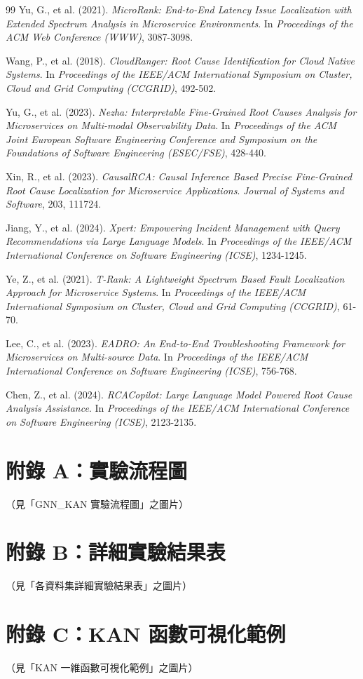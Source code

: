 \documentclass[10pt,a4paper,twocolumn]{article}
\begin{document}
\begin{thebibliography}{99}
Yu, G., et al. (2021).
\textit{MicroRank: End-to-End Latency Issue Localization with Extended Spectrum Analysis in Microservice Environments}.
In \textit{Proceedings of the ACM Web Conference (WWW)}, 3087-3098.

Wang, P., et al. (2018).
\textit{CloudRanger: Root Cause Identification for Cloud Native Systems}.
In \textit{Proceedings of the IEEE/ACM International Symposium on Cluster, Cloud and Grid Computing (CCGRID)}, 492-502.

Yu, G., et al. (2023).
\textit{Nezha: Interpretable Fine-Grained Root Causes Analysis for Microservices on Multi-modal Observability Data}.
In \textit{Proceedings of the ACM Joint European Software Engineering Conference and Symposium on the Foundations of Software Engineering (ESEC/FSE)}, 428-440.

Xin, R., et al. (2023).
\textit{CausalRCA: Causal Inference Based Precise Fine-Grained Root Cause Localization for Microservice Applications}.
\textit{Journal of Systems and Software}, 203, 111724.

Jiang, Y., et al. (2024).
\textit{Xpert: Empowering Incident Management with Query Recommendations via Large Language Models}.
In \textit{Proceedings of the IEEE/ACM International Conference on Software Engineering (ICSE)}, 1234-1245.

Ye, Z., et al. (2021).
\textit{T-Rank: A Lightweight Spectrum Based Fault Localization Approach for Microservice Systems}.
In \textit{Proceedings of the IEEE/ACM International Symposium on Cluster, Cloud and Grid Computing (CCGRID)}, 61-70.

Lee, C., et al. (2023).
\textit{EADRO: An End-to-End Troubleshooting Framework for Microservices on Multi-source Data}.
In \textit{Proceedings of the IEEE/ACM International Conference on Software Engineering (ICSE)}, 756-768.

Chen, Z., et al. (2024).
\textit{RCACopilot: Large Language Model Powered Root Cause Analysis Assistance}.
In \textit{Proceedings of the IEEE/ACM International Conference on Software Engineering (ICSE)}, 2123-2135.

\end{thebibliography}

\appendix

\section{附錄 A：實驗流程圖}

（見「GNN\_KAN 實驗流程圖」之圖片）

\section{附錄 B：詳細實驗結果表}

（見「各資料集詳細實驗結果表」之圖片）

\section{附錄 C：KAN 函數可視化範例}

（見「KAN 一維函數可視化範例」之圖片）
\end{document}
